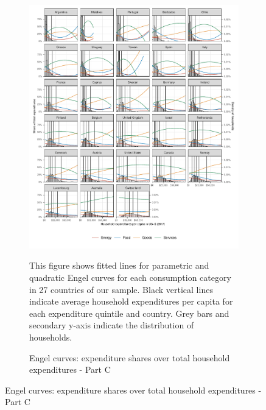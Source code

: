 \begin{figure}[ht!]\ContinuedFloat
   \begin{subfigure}[b]{\textwidth}
  \centering
  \includegraphics{1_Figures/Analysis_Parametric_Engel_Curves/Parametric_EC_0_C.pdf}
  \caption{Engel curves: expenditure shares over total household expenditures - Part C} \label{fig:Engel_3}
  \begin{subcaption2}
    This figure shows fitted lines for parametric and quadratic Engel curves for each consumption category in 27 countries of our sample. Black vertical lines indicate average household expenditures per capita for each expenditure quintile and country. Grey bars and secondary y-axis indicate the distribution of households.
  \end{subcaption2}
\end{subfigure}
\end{figure}


